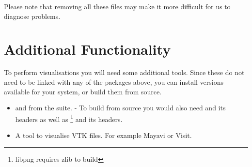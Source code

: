 Please note that removing all these files may make it more difficult for us to diagnose problems.




\section{Additional Functionality}\label{sec:linaddfunc}
To perform visualisations you will need some additional tools.
Since these do not need to be linked with any of the packages above, you can install versions available for your
system, or build them from source.
\begin{itemize}
\item {} and  from the  suite. - To build from source 
you would also need  and its headers as well as \footnote{libpng requires zlib to build} and its headers.
\item A tool to visualise VTK files. For example Mayavi or Visit.
\end{itemize}
